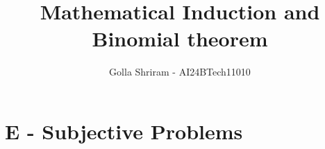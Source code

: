 \documentclass[journal,12pt,twocolumn]{IEEEtran}
\theoremstyle{remark}
\begin{document}

\vspace{3cm}
\title{Mathematical Induction and Binomial theorem}
\author{Golla Shriram - AI24BTech11010}

\maketitle
\newpage
\bigskip

\renewcommand{\thefigure}{\theenumi}
\renewcommand{\thetable}{\theenumi}


\section{E - Subjective Problems}
                                                                           
\end{document}
